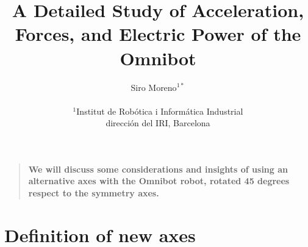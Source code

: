 \documentclass[12pt]{article}
\title{A Detailed Study of Acceleration, Forces, and Electric Power of the Omnibot}
\author
{Siro Moreno$^{1\ast}$ \\
\\
\normalsize{$^{1}$Institut de Robótica i Informática Industrial}\\
\normalsize{dirección del IRI, Barcelona}\\
}
\date{}
\newenvironment{sciabstract}{%
\begin{quote} \bf}
{\end{quote}}
\begin{document}
 


\baselineskip24pt


\maketitle 




\begin{sciabstract}
  We will discuss some considerations and insights of using an alternative axes with the Omnibot robot, rotated 45 degrees respect to the symmetry axes.
\end{sciabstract}




\section{Definition of new axes}
\end{document}
